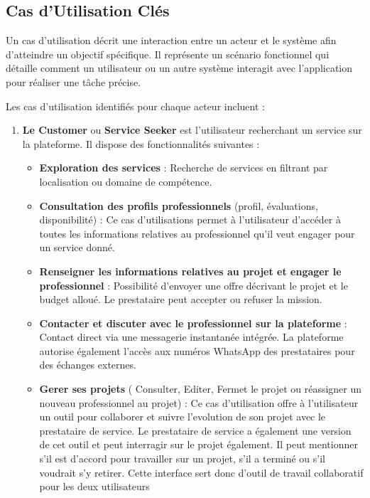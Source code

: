 {\subsection{Cas d’Utilisation Clés}

Un cas d’utilisation décrit une interaction entre un acteur et le système afin d’atteindre un objectif spécifique. Il représente un scénario fonctionnel qui détaille comment un utilisateur ou un autre système interagit avec l’application pour réaliser une tâche précise.

\vspace{0.39cm}

Les cas d'utilisation identifiés pour chaque acteur incluent :

\vspace{0.39cm}

\begin{enumerate}
    \item \textbf{Le Customer} ou \textbf{Service Seeker} est l’utilisateur recherchant un service sur la plateforme. Il dispose des fonctionnalités suivantes : 
    \vspace{0.39cm}
        \begin{itemize}
            \item \textbf{Exploration des services} : Recherche de services en filtrant par localisation ou domaine de compétence. 
            \item \textbf{Consultation des profils professionnels} (profil, évaluations, disponibilité) : Ce cas d'utilisations permet à l'utilisateur d'accéder à toutes les informations relatives au professionnel qu'il  veut engager pour un service donné.
            \item \textbf{Renseigner les informations relatives au projet et engager le professionnel} : Possibilité d’envoyer une offre décrivant le projet et le budget alloué. Le prestataire peut accepter ou refuser la mission.
            \item \textbf{Contacter et discuter avec le professionnel sur la plateforme} : Contact direct via une messagerie instantanée intégrée. La plateforme autorise également l’accès aux numéros WhatsApp des prestataires pour des échanges externes.
            \item \textbf{Gerer ses projets} ( Consulter, Editer, Fermet le projet ou réassigner un nouveau professionnel au projet) : Ce cas d'utilisation offre à l'utilisateur un outil pour collaborer et suivre l'evolution de son projet avec le prestataire de service. Le prestataire de service a également une version de cet outil et peut interragir sur le projet également. Il peut mentionner s'il est d'accord pour travailler sur un projet, s'il a terminé ou s'il voudrait s'y retirer. Cette interface sert donc d'outil de travail collaboratif pour les deux utilisateurs

\end{itemize}
\end{enumerate}}
